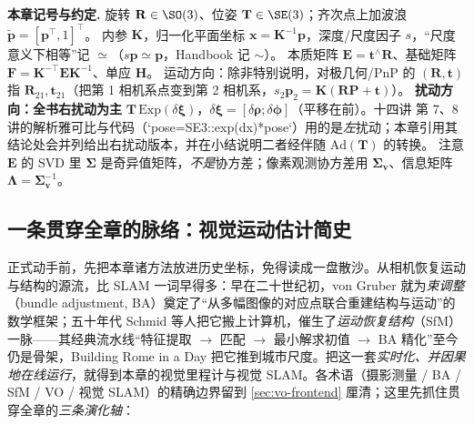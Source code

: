 \begin{note}
\textbf{本章记号与约定.}\;
旋转 $\mathbf{R}\in\SO(3)$、位姿 $\mathbf{T}\in\SE(3)$；齐次点上加波浪 $\tilde{\mathbf{p}}=[\mathbf{p}^\top,1]^\top$。
内参 $\mathbf{K}$，归一化平面坐标 $\mathbf{x}=\mathbf{K}^{-1}\mathbf{p}$，深度/尺度因子 $s$，“尺度意义下相等”记 $\simeq$（$s\mathbf{p}\simeq\mathbf{p}$，Handbook\cite{carlone2026handbook} 记 $\sim$）。
本质矩阵 $\mathbf{E}=\mathbf{t}^\wedge\mathbf{R}$、基础矩阵 $\mathbf{F}=\mathbf{K}^{-\top}\mathbf{E}\mathbf{K}^{-1}$、单应 $\mathbf{H}$。
运动方向：除非特别说明，对极几何/PnP 的 $(\mathbf{R},\mathbf{t})$ 指 $\mathbf{R}_{21},\mathbf{t}_{21}$（把第 1 相机系点变到第 2 相机系，$s_2\mathbf{p}_2=\mathbf{K}(\mathbf{R}\mathbf{P}+\mathbf{t})$）。
\textbf{扰动方向：全书右扰动为主} $\mathbf{T}\,\mathrm{Exp}(\delta\boldsymbol{\xi})$，$\delta\boldsymbol{\xi}=[\delta\boldsymbol{\rho};\delta\boldsymbol{\phi}]$（平移在前）。十四讲\cite{gaoxiang2019slam14} 第 7、8 讲的解析雅可比与代码（`pose=SE3::exp(dx)*pose`）用的是\emph{左}扰动；本章引用其结论处会并列给出右扰动版本，并在小结说明二者经伴随 $\mathrm{Ad}(\mathbf{T})$ 的转换。
注意 $\mathbf{E}$ 的 SVD 里 $\boldsymbol{\Sigma}$ 是奇异值矩阵，\emph{不是}协方差；像素观测协方差用 $\boldsymbol{\Sigma}_{\mathbf v}$、信息矩阵 $\boldsymbol{\Lambda}=\boldsymbol{\Sigma}_{\mathbf v}^{-1}$。
\end{note}

\subsection*{一条贯穿全章的脉络：视觉运动估计简史}
正式动手前，先把本章诸方法放进历史坐标，免得读成一盘散沙。从相机恢复运动与结构的源流，比 SLAM 一词早得多：早在二十世纪初，von Gruber 就为\emph{束调整}（bundle adjustment, BA）奠定了“从多幅图像的对应点联合重建结构与运动”的数学框架；五十年代 Schmid 等人把它搬上计算机，催生了\emph{运动恢复结构}（SfM）一脉——其经典流水线“特征提取 $\to$ 匹配 $\to$ 最小解求初值 $\to$ BA 精化”至今仍是骨架，Building Rome in a Day\cite{carlone2026handbook} 把它推到城市尺度。把这一套\emph{实时化、并因果地在线运行}，就得到本章的视觉里程计与视觉 SLAM。各术语（摄影测量 / BA / SfM / VO / 视觉 SLAM）的精确边界留到 \cref{sec:vo-frontend} 厘清；这里先抓住贯穿全章的\emph{三条演化轴}：

